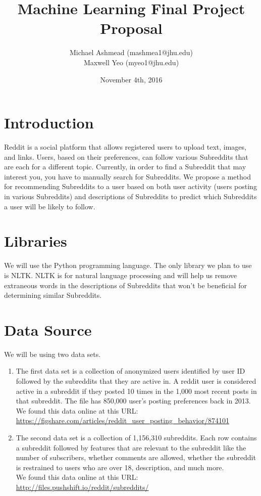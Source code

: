 \documentclass{article}
\title{Machine Learning Final Project Proposal}
\author{Michael Ashmead (mashmea1@jhu.edu)\\Maxwell Yeo (myeo1@jhu.edu)}
\date{November 4th, 2016}
\begin{document}
\maketitle

\section{Introduction}
Reddit is a social platform that allows registered users to upload text, images, and links. Users, based on their preferences, can follow various Subreddits that are each for a different topic. Currently, in order to find a Subreddit that may interest you, you have to manually search for Subreddits. We propose a method for recommending Subreddits to a user based on both user activity (users posting in various Subreddits) and descriptions of Subreddits to predict which Subreddits a user will be likely to follow.

\section{Libraries} 
We will use the Python programming language. The only library we plan to use is NLTK. NLTK is for natural language processing and will help us remove extraneous words in the descriptions of Subreddits that won't be beneficial for determining similar Subreddits.

\section{Data Source}

We will be using two data sets.  
\begin{enumerate}
\item The first data set is a collection of anonymized users identified by user ID followed by the subreddits that they are active in.  A reddit user is considered active in a subreddit if they posted 10 times in the 1,000 most recent posts in that subreddit.  The file has 850,000 user's posting preferences back in 2013.  \\
We found this data online at this URL: \url{https://figshare.com/articles/reddit_user_posting_behavior/874101}
\item The second data set is a collection of 1,156,310 subreddits.  Each row contains a subreddit followed by features that are relevant to the subreddit like the number of subscribers, whether comments are allowed, whether the subreddit is restrained to users who are over 18, description, and much more.\\
We found this data online at this URL:
\url{http://files.pushshift.io/reddit/subreddits/}
\end{enumerate}
\end{document}

